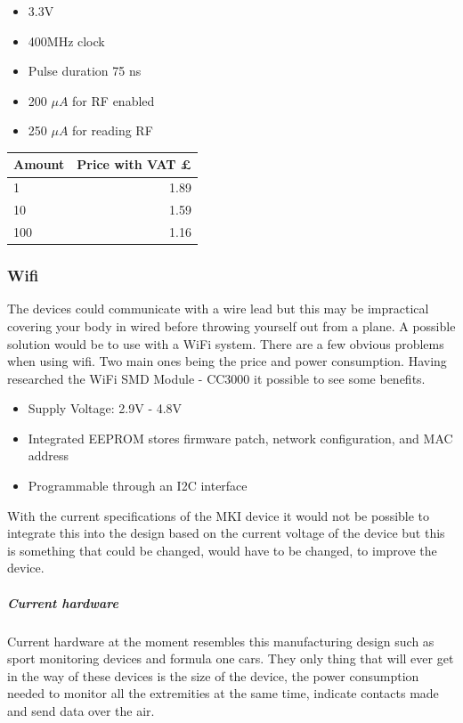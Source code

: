 \documentclass{report}
\begin{document}
\begin{itemize}
\item 3.3V
\item 400MHz clock
\item Pulse duration 75 ns
\item 200 $\mu A$ for RF enabled 
\item 250 $\mu A$ for reading RF
\end{itemize}

\begin{center}
  \begin{tabular}{ | l | r |}
    \hline
    Amount &  Price with VAT £ \\ \hline
    1 & 1.89  \\ \hline
    10 & 1.59  \\ \hline
    100 & 1.16 \\ \hline
	\end{tabular}
\end{center}


\subsubsection{Wifi}

The devices could communicate with a wire lead but this may be impractical covering your body in wired before throwing yourself out from a plane. A possible solution would be to use with a WiFi system. There are a few obvious problems when using wifi. Two main ones being the price and power consumption. Having researched the WiFi SMD Module - CC3000 it possible to see some benefits.

\begin{itemize}
\item Supply Voltage: 2.9V - 4.8V
\item Integrated EEPROM stores firmware patch, network configuration, and MAC address
\item Programmable through an I2C interface
\end{itemize}
With the current specifications of the MKI device it would not be possible to integrate this into the design based on the current voltage of the device but this is something that could be changed, would have to be changed, to improve the device.
\subparagraph{Current hardware}
Current hardware at the moment resembles this manufacturing design such as sport monitoring devices and formula one cars. They only thing that will ever get in the way of these devices is the size of the device, the power consumption needed to monitor all the extremities at the same time, indicate contacts made and send data over the air. 
\end{document}
